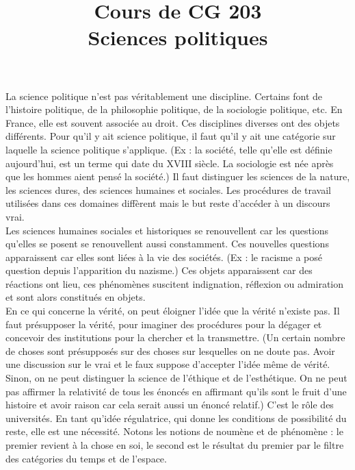 \documentclass[a4paper,11pt]{article}
\title{
	\textbf{Cours de CG 203} \\
	Sciences politiques}
\author{}
\date{}
\begin{document}
\maketitle

	La science politique n’est pas véritablement une discipline.
	Certains font de l’histoire politique, de la philosophie politique, de la sociologie politique, etc. En France, elle est souvent associée au droit.
	Ces disciplines diverses ont des objets différents.
	Pour qu’il y ait science politique, il faut qu’il y ait une catégorie sur laquelle la science politique s’applique. (Ex : la société, telle qu’elle est définie aujourd’hui, est un terme qui date du XVIII siècle.
	La sociologie est née après que les hommes aient pensé la société.) Il faut distinguer les sciences de la nature, les sciences dures, des sciences humaines et sociales.
	Les procédures de travail utilisées dans ces domaines diffèrent mais le but reste d’accéder à un discours vrai.\\

	Les sciences humaines sociales et historiques se renouvellent car les questions qu’elles se posent se renouvellent aussi constamment.
	Ces nouvelles questions apparaissent car elles sont liées à la vie des sociétés. (Ex : le racisme a posé question depuis l’apparition du nazisme.) Ces objets apparaissent car des réactions ont lieu, ces phénomènes suscitent indignation, réflexion ou admiration et sont alors constitués en objets.\\
	

	En ce qui concerne la vérité, on peut éloigner l’idée que la vérité n’existe pas. Il faut présupposer la vérité, pour imaginer des procédures pour la dégager et concevoir des institutions pour la chercher et la transmettre. (Un certain nombre de choses sont présupposés sur des choses sur lesquelles on ne doute pas. Avoir une discussion sur le vrai et le faux suppose d’accepter l’idée même de vérité. Sinon, on ne peut distinguer la science de l’éthique et de l’esthétique. On ne peut pas affirmer la relativité de tous les énoncés en affirmant qu’ils sont le fruit d’une histoire et avoir raison car cela serait aussi un énoncé relatif.) C’est le rôle des universités. En tant qu’idée régulatrice, qui donne les conditions de possibilité du reste, elle est une nécessité. Notons les notions de noumène et de phénomène : le premier revient à la chose en soi, le second est le résultat du premier par le filtre des catégories du temps et de l’espace.\\
\end{document}
